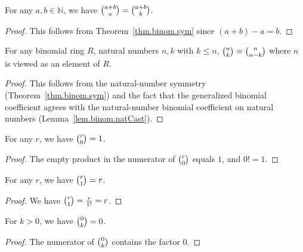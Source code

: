 \begin{lemma}
\label{lem.binom.symm_add}
\leanhelper
\leanok
For any $a, b \in \mathbb{N}$, we have $\dbinom{a+b}{a} = \dbinom{a+b}{b}$.
\end{lemma}

\begin{proof}
\leanok
This follows from Theorem~\ref{thm.binom.sym} since $(a+b) - a = b$.
\end{proof}

\begin{lemma}
\label{lem.binom.symm_ring}
\leanhelper
\leanok
For any binomial ring $R$, natural numbers $n, k$ with $k \leq n$,
$\dbinom{n}{k} = \dbinom{n}{n-k}$
where $n$ is viewed as an element of $R$.
\end{lemma}

\begin{proof}
\leanok
This follows from the natural-number symmetry (Theorem~\ref{thm.binom.sym})
and the fact that the generalized binomial coefficient agrees with the
natural-number binomial coefficient on natural numbers (Lemma~\ref{lem.binom.natCast}).
\end{proof}

\begin{lemma}
\label{lem.binom.zero_right}
\leanhelper
\leanok
For any $r$, we have $\dbinom{r}{0} = 1$.
\end{lemma}

\begin{proof}
\leanok
The empty product in the numerator of $\dbinom{r}{0}$ equals $1$, and $0! = 1$.
\end{proof}

\begin{lemma}
\label{lem.binom.one_right}
\leanhelper
\leanok
For any $r$, we have $\dbinom{r}{1} = r$.
\end{lemma}

\begin{proof}
\leanok
We have $\dbinom{r}{1} = \frac{r}{1!} = r$.
\end{proof}

\begin{lemma}
\label{lem.binom.zero_left_pos}
\leanhelper
\leanok
For $k > 0$, we have $\dbinom{0}{k} = 0$.
\end{lemma}

\begin{proof}
\leanok
The numerator of $\dbinom{0}{k}$ contains the factor $0$.
\end{proof}

